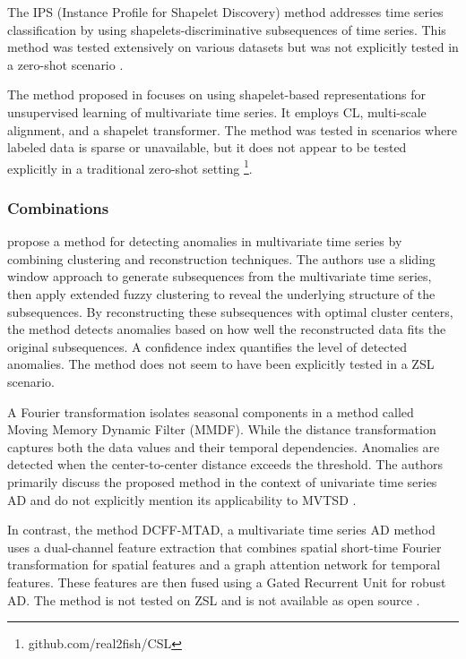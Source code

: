 The IPS (Instance Profile for Shapelet Discovery) method addresses time series classification by using shapelets-discriminative subsequences of time series. This method was tested extensively on various datasets but was not explicitly tested in a zero-shot scenario \cite{li_ips_2022}.

The method proposed in \cite{liang_shapelet-based_2024} focuses on using shapelet-based representations for unsupervised learning of multivariate time series. It employs CL, multi-scale alignment, and a shapelet transformer. The method was tested in scenarios where labeled data is sparse or unavailable, but it does not appear to be tested explicitly in a traditional zero-shot setting \footnote{\fussy\tiny github.com/real2fish/CSL}.

\subsubsection{Combinations}
\cite{li_clustering-based_2021} propose a method for detecting anomalies in multivariate time series by combining clustering and reconstruction techniques. The authors use a sliding window approach to generate subsequences from the multivariate time series, then apply extended fuzzy clustering to reveal the underlying structure of the subsequences. By reconstructing these subsequences with optimal cluster centers, the method detects anomalies based on how well the reconstructed data fits the original subsequences. A confidence index quantifies the level of detected anomalies. The method does not seem to have been explicitly tested in a ZSL scenario.

A Fourier transformation isolates seasonal components in a method called Moving Memory Dynamic Filter (MMDF). While the distance transformation captures both the data values and their temporal dependencies. Anomalies are detected when the center-to-center distance exceeds the threshold. The authors primarily discuss the proposed method in the context of univariate time series AD and do not explicitly mention its applicability to MVTSD \cite{duan_unsupervised_2021}.

In contrast, the method DCFF-MTAD, a multivariate time series AD method uses a dual-channel feature extraction that combines spatial short-time Fourier transformation for spatial features and a graph attention network for temporal features. These features are then fused using a Gated Recurrent Unit for robust AD. The method is not tested on ZSL and is not available as open source \cite{xu_dcff-mtad_2023}.
